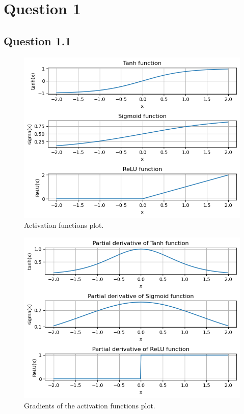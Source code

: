 \documentclass{assignment}
\date{\today}
\begin{document}
\section{Question 1}

\subsection{Question 1.1}
\begin{figure}
    \centering
    \includegraphics[width=1\textwidth]{figures/q1_1.png}
    \caption{Activation functions plot.}
    \label{fig:activation_functions}
\end{figure}



\begin{figure}
    \centering
    \includegraphics[width=1\textwidth]{figures/q1_2.png}
    \caption{Gradients of the activation functions plot.}
    \label{fig:activation_functions_gradient}
\end{figure}
\end{document}
